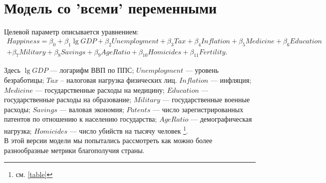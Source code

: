\documentclass[russian]{vegareport}
\begin{document}
        \section{Модель со 'всеми' переменными}
        Целевой параметр описывается уравнением:
        \begin{align*}
        Happiness = \beta_0 + \beta_1 \lg{GDP} + \beta_2 Unemployment + \beta_3 Tax + \beta_4 Inflation + \beta_5 Medicine + \beta_6 Education \\
            + \beta_7 Military + \beta_8 Savings + \beta_{9} AgeRatio + \beta_{10} Homicides + \beta_{11} Fertility.
        \end{align*}

        Здесь $\lg{GDP}$ --- логарифм ВВП по ППС; $Unemployment$ --- уровень безработицы; $Tax$ -- налоговая нагрузка физических лиц. $Inflation$ --- инфляция; $Medicine$ --- государственные расходы на медицину; $Education$ --- государственные расходы на образование; $Military$ --- государственные военные расходы; $Savings$ --- валовая экономия; $Patents$ --- число зарегистрированных патентов по отношению к населению государства; $AgeRatio$ --- демографическая нагрузка; $Homicides$ --- число убийств на тысячу человек \footnote{см. \ref{table}}.
        \\
        В этой версии модели мы попытались рассмотреть как можно более разнообразные метрики благополучия страны.
    
    
\end{document}
